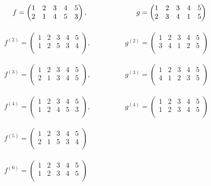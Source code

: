 $\hspace{0.4cm} f = \begin{pmatrix}
1 & 2 & 3 & 4 & 5\\
2 & 1 & 4 & 5 & 3\\
\end{pmatrix}, \hspace{2.4cm} g = \begin{pmatrix}
1 & 2 & 3 & 4 & 5\\
2 & 3 & 4 & 1 & 5\\
\end{pmatrix}$\\~\\

$f^{(2)} = \begin{pmatrix}
1 & 2 & 3 & 4 & 5\\
1 & 2 & 5 & 3 & 4\\
\end{pmatrix}, \hspace{2cm} g^{(2)} = \begin{pmatrix}
1 & 2 & 3 & 4 & 5\\
3 & 4 & 1 & 2 & 5\\
\end{pmatrix}$\\~\\

$f^{(3)} = \begin{pmatrix}
1 & 2 & 3 & 4 & 5\\
2 & 1 & 3 & 4 & 5\\
\end{pmatrix}, \hspace{2cm} g^{(3)} = \begin{pmatrix}
1 & 2 & 3 & 4 & 5\\
4 & 1 & 2 & 3 & 5\\
\end{pmatrix}$\\~\\

$f^{(4)} = \begin{pmatrix}
1 & 2 & 3 & 4 & 5\\
1 & 2 & 4 & 5 & 3\\
\end{pmatrix}, \hspace{2cm} g^{(4)} = \begin{pmatrix}
1 & 2 & 3 & 4 & 5\\
1 & 2 & 3 & 4 & 5\\
\end{pmatrix}$\\~\\

$f^{(5)} = \begin{pmatrix}
1 & 2 & 3 & 4 & 5\\
2 & 1 & 5 & 3 & 4\\
\end{pmatrix}$\\~\\

$f^{(6)} = \begin{pmatrix}
1 & 2 & 3 & 4 & 5\\
1 & 2 & 3 & 4 & 5\\
\end{pmatrix}$\\~\\